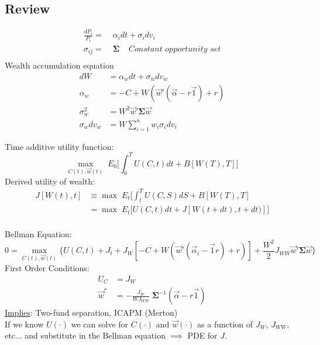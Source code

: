 \documentclass[
14pt,notheorems,hyperref={pdfauthor=whatever}
]{beamer}
\begin{document}
\subsection{Review}
\begin{frame}
\begin{align*}
    \frac{dP_i}{P_i} =&\; \alpha_i dt + \sigma_i dv_i\\
    \sigma_{ij} =&\; \bm{\Sigma} \;\;\;\; \textit{Constant opportunity set}\\
\end{align*}
Wealth accumulation equation\\
\begin{align*}
    dW &= \alpha_w dt + \sigma_w dv_w\\
    \alpha_w &= -C + W(\vec{w}'(\vec{\alpha}-r\vec{1})+r)\\
    \sigma_w^2 &= W^2 \vec{w}'\bm{\Sigma}\vec{w}\\
    \sigma_w dv_w &= W \sum_{i=1}^n w_i \sigma_i dv_i
\end{align*}
\end{frame}

\begin{frame}
Time additive utility function:\\
\[ \max_{C(t),\vec{w}(t)}\; E_0\Bigg[\int_0^T U(C,t)dt + B[W(T),T]\Bigg]\]
Derived utility of wealth:\\
\begin{align*}
    J[W(t),t] &\equiv \max\;E_t \Bigg[ \int_t^T U(C,S)dS + B[W(T),T]\\
    &= \max\; E_t \Bigg[U(C,t)dt + J[W(t+dt),t+dt)]\Bigg]\\
\end{align*}
\end{frame}

\begin{frame}
Bellman Equation:
\[ 0 = \max_{C(t),\vec{w}(t)} \Bigg\{ U(C,t)+J_t+J_W[-C+W(\vec{w}'(\vec{\alpha}_i-\vec{1}r)+r)] + \frac{W^2}{2} J_{WW} \vec{w}' \bm{\Sigma} \vec{w} \Bigg\} \]
First Order Conditions:
\begin{align*}
    U_C &= J_W\\
    \vec{w}^* &= -\frac{J_W}{W J_{WW}}\;\bm{\Sigma}^{-1}(\vec{\alpha}-r\vec{1})
\end{align*}
\underline{Implies}: Two-fund separation, ICAPM (Merton)\\
If we know $U(\cdot)$ we can solve for $C(\cdot)$ and $\vec{w}(\cdot)$ as a function of $J_W$, $J_{WW}$, etc... and substitute in the Bellman equation $\implies$ PDE for $J$.\\
\end{frame}
\end{document}
